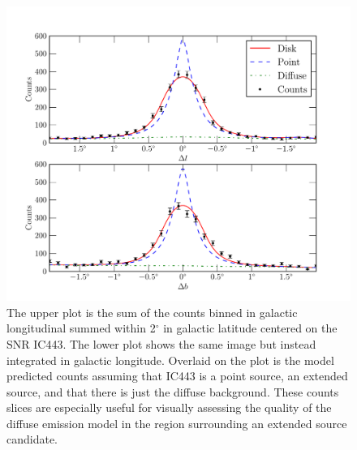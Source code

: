 \documentclass[12pt,preprint]{aastex}
\renewcommand{\deg}{\ensuremath{^\circ}\xspace}
\begin{document}
\clearpage
\begin{figure}
  \begin{center}
    \includegraphics{ic443_plots/ic443_counts_slice.pdf}
    \caption{
    The upper plot is the sum of the counts binned in galactic longitudinal
    summed within 2\deg in galactic latitude centered on the SNR
    IC443. The lower plot shows the same image but instead integrated
    in galactic longitude.  Overlaid on the plot is the model predicted
    counts assuming that IC443 is a point source, an extended source,
    and that there is just the diffuse background. These counts slices
    are especially useful for visually assessing the quality of
    the diffuse emission model in the region surrounding an
    extended source candidate.
    \label{counts_slice}
    }
  \end{center}
\end{figure}
\end{document}
